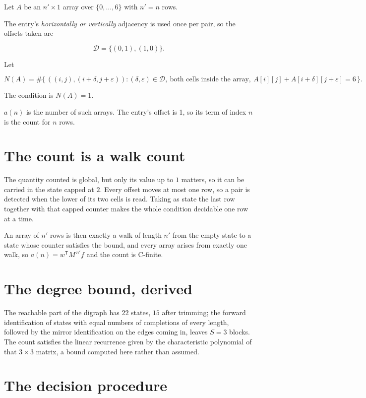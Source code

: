 \documentclass[11pt]{article}
\theoremstyle{definition}
\begin{document}
Let $A$ be an $n' \times 1$ array over $\{0,\dots,6\}$ with $n' = n$ rows.

The entry's {\itshape horizontally or vertically} adjacency is used once per pair, so the offsets taken are

\[\mathcal{D} = \{(0,1), (1,0)\}.\]

Let

\[N(A) = \#\bigl\{\,((i,j),(i{+}\delta,j{+}\varepsilon)) : (\delta,\varepsilon) \in \mathcal{D},\ \text{both cells inside the array},\ A[i][j] + A[i{+}\delta][j{+}\varepsilon] = 6\,\bigr\}.\]

The condition is $N(A) = 1$.

$a(n)$ is the number of such arrays. The entry's offset is 1, so its term of index $n$ is the count for $n$ rows.

\section{The count is a walk count}

The quantity counted is global, but only its value up to $1$ matters, so it can be carried in the state capped at $2$. Every offset moves at most one row, so a pair is detected when the lower of its two cells is read. Taking as state the last row together with that capped counter makes the whole condition decidable one row at a time.

An array of $n'$ rows is then exactly a walk of length $n'$ from the empty state to a state whose counter satisfies the bound, and every array arises from exactly one walk, so $a(n) = w^{\mathsf T}M^{\,n'}f$ and the count is C-finite.

\section{The degree bound, derived}

The reachable part of the digraph has $22$ states, $15$ after trimming; the forward identification of states with equal numbers of completions of every length, followed by the mirror identification on the edges coming in, leaves $S = 3$ blocks. The count satisfies the linear recurrence given by the characteristic polynomial of that $3\times3$ matrix, a bound computed here rather than assumed.

\section{The decision procedure}
\end{document}
